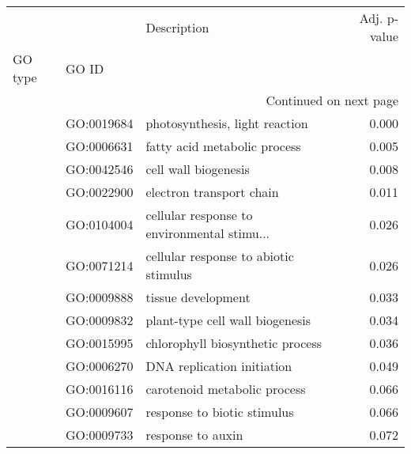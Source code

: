 \begin{longtable}{lllr}
\toprule
   &            &                                  Description &  Adj. p-value \\
GO type & GO ID &                                              &               \\
\midrule
\endhead
\midrule
\multicolumn{4}{r}{{Continued on next page}} \\
\midrule
\endfoot

\bottomrule
\endlastfoot
\multirow{13}{*}{BP} & GO:0019684 &               photosynthesis, light reaction &         0.000 \\
   & GO:0006631 &                 fatty acid metabolic process &         0.005 \\
   & GO:0042546 &                         cell wall biogenesis &         0.008 \\
   & GO:0022900 &                     electron transport chain &         0.011 \\
   & GO:0104004 &  cellular response to environmental stimu... &         0.026 \\
   & GO:0071214 &        cellular response to abiotic stimulus &         0.026 \\
   & GO:0009888 &                           tissue development &         0.033 \\
   & GO:0009832 &              plant-type cell wall biogenesis &         0.034 \\
   & GO:0015995 &             chlorophyll biosynthetic process &         0.036 \\
   & GO:0006270 &                   DNA replication initiation &         0.049 \\
   & GO:0016116 &                 carotenoid metabolic process &         0.066 \\
   & GO:0009607 &                  response to biotic stimulus &         0.066 \\
   & GO:0009733 &                            response to auxin &         0.072 \\
\end{longtable}

